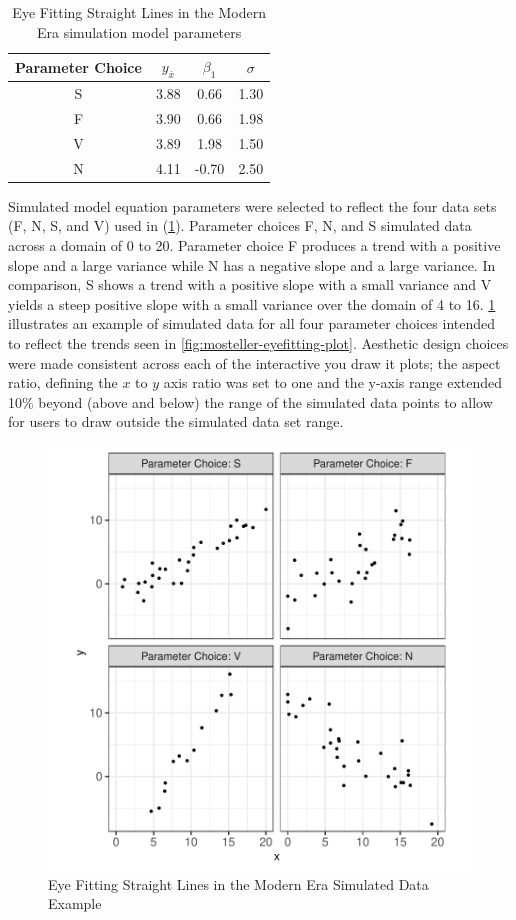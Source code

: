 \documentclass[12pt]{article}
\begin{document}
\begin{table}

\caption{\label{tab:eyefitting-parameters}Eye Fitting Straight Lines in the Modern Era simulation model parameters}
\centering
\begin{tabular}[t]{cccc}
\toprule
Parameter Choice & $y_{\bar{x}}$ & $\beta_1$ & $\sigma$\\
\midrule
S & 3.88 & 0.66 & 1.30\\
F & 3.90 & 0.66 & 1.98\\
V & 3.89 & 1.98 & 1.50\\
N & 4.11 & -0.70 & 2.50\\
\bottomrule
\end{tabular}
\end{table}

Simulated model equation parameters were selected to reflect the four
data sets (F, N, S, and V) used in \citet{mosteller_eye_1981}
(\cref{tab:eyefitting-parameters}). Parameter choices F, N, and S
simulated data across a domain of 0 to 20. Parameter choice F produces a
trend with a positive slope and a large variance while N has a negative
slope and a large variance. In comparison, S shows a trend with a
positive slope with a small variance and V yields a steep positive slope
with a small variance over the domain of 4 to 16.
\cref{fig:eyefitting-simplot} illustrates an example of simulated data
for all four parameter choices intended to reflect the trends seen in
\cref{fig:mosteller-eyefitting-plot}. Aesthetic design choices were made
consistent across each of the interactive you draw it plots; the aspect
ratio, defining the \(x\) to \(y\) axis ratio was set to one and the
y-axis range extended 10\% beyond (above and below) the range of the
simulated data points to allow for users to draw outside the simulated
data set range.

\begin{figure}[tbp]

{\centering \includegraphics[width=0.75\linewidth,]{Eye-Fitting-Stright-Lines-in-the-Modern-Era_files/figure-latex/eyefitting-simplot-1} 

}

\caption{Eye Fitting Straight Lines in the Modern Era Simulated Data Example}\label{fig:eyefitting-simplot}
\end{figure}
\end{document}
